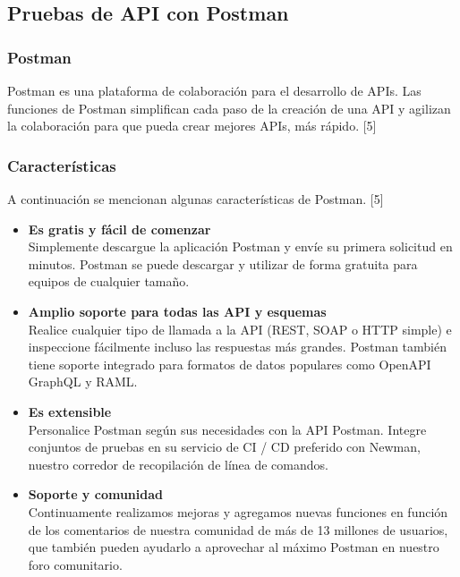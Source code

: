 \documentclass[twoside,twocolumn]{article}
\begin{document}
\subsection{Pruebas de API con Postman}

\subsubsection{Postman}

Postman es una plataforma de colaboración para el desarrollo de APIs. Las funciones de Postman simplifican cada paso de la creación de una API y agilizan la colaboración para que pueda crear mejores APIs, más rápido. [5]

\subsubsection{Características}

A continuación se mencionan algunas características de Postman. [5]

\begin{itemize}
  \item \textbf{Es gratis y fácil de comenzar} \\
  Simplemente descargue la aplicación Postman y envíe su primera solicitud en minutos. Postman se puede descargar y utilizar de forma gratuita para equipos de cualquier tamaño.

  \item \textbf{Amplio soporte para todas las API y esquemas} \\
  Realice cualquier tipo de llamada a la API (REST, SOAP o HTTP simple) e inspeccione fácilmente incluso las respuestas más grandes. Postman también tiene soporte integrado para formatos de datos populares como OpenAPI GraphQL y RAML.

  \item \textbf{Es extensible} \\
  Personalice Postman según sus necesidades con la API Postman. Integre conjuntos de pruebas en su servicio de CI / CD preferido con Newman, nuestro corredor de recopilación de línea de comandos.

  \item \textbf{Soporte y comunidad} \\
  Continuamente realizamos mejoras y agregamos nuevas funciones en función de los comentarios de nuestra comunidad de más de 13 millones de usuarios, que también pueden ayudarlo a aprovechar al máximo Postman en nuestro foro comunitario.
\end{itemize}
\end{document}
